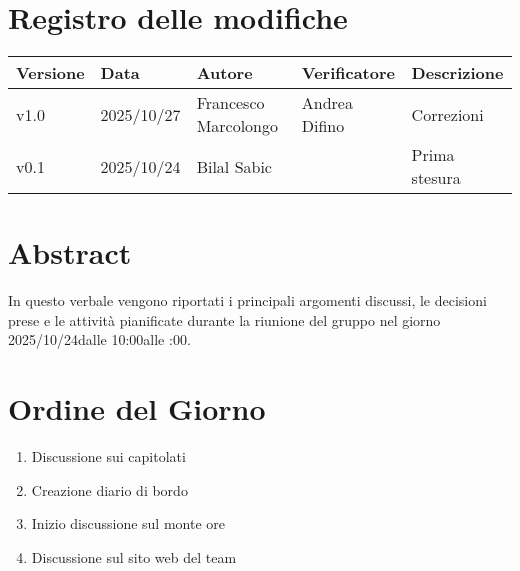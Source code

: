 \documentclass[a4paper,12pt]{article}
\newcommand{\DataVerbale}{2025/10/24}
\newcommand{\OraInizio}{10:00}
\newcommand{\OraFine}{12:00}
\newcommand{\AbstractVerbale}{%
In questo verbale vengono riportati i principali argomenti discussi, le decisioni prese e le attività pianificate durante la riunione del gruppo nel giorno \DataVerbale \space dalle \OraInizio \space alle \space \OraFine .
}
\newcommand{\VersioneVerbale}{v1.0} %
\begin{document}
\section*{Registro delle modifiche}{
    \begin{center} 
        \begin{tabular}{|l|l|l|l|l|}
            \hline
            \textbf{Versione} & \textbf{Data} & \textbf{Autore} & \textbf{Verificatore} & \textbf{Descrizione} \\
            \hline
            \VersioneVerbale & 2025/10/27 & Francesco Marcolongo & Andrea Difino & Correzioni \\
            \hline
            v0.1 & \DataVerbale & Bilal Sabic & & Prima stesura \\
            \hline
        \end{tabular}
    \end{center}
}

\newpage

\tableofcontents

\newpage
\section{Abstract}{
    \begin{minipage}{0.9\textwidth}
        \small
        \AbstractVerbale
    \end{minipage}
}


\section{Ordine del Giorno}{
    \begin{enumerate}
        \item Discussione sui capitolati
        \item Creazione diario di bordo
        \item Inizio discussione sul monte ore
        \item Discussione sul sito web del team
    \end{enumerate}
}
\end{document}
